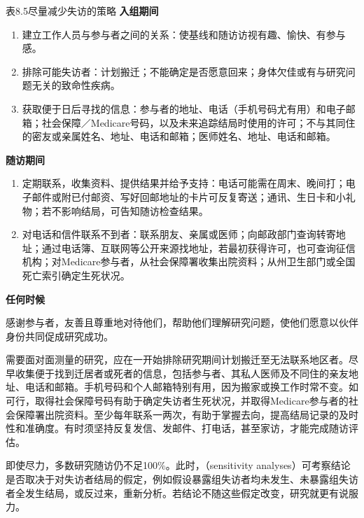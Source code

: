 \begin{bookbox}{表8.5\quad 尽量减少失访的策略}
\textbf{入组期间}
\begin{enumerate}
\item 建立工作人员与参与者之间的关系：使基线和随访访视有趣、愉快、有参与感。
\item 排除可能失访者：计划搬迁；不能确定是否愿意回来；身体欠佳或有与研究问题无关的致命性疾病。
\item 获取便于日后寻找的信息：参与者的地址、电话（手机号码尤有用）和电子邮箱；社会保障／Medicare号码，以及未来追踪结局时使用的许可；不与其同住的密友或亲属姓名、地址、电话和邮箱；医师姓名、地址、电话和邮箱。
\end{enumerate}
\textbf{随访期间}
\begin{enumerate}
\item 定期联系，收集资料、提供结果并给予支持：电话可能需在周末、晚间打；电子邮件或附已付邮资、写好回邮地址的卡片可反复寄送；通讯、生日卡和小礼物；若不影响结局，可告知随访检查结果。
\item 对电话和信件联系不到者：联系朋友、亲属或医师；向邮政部门查询转寄地址；通过电话簿、互联网等公开来源找地址，若最初获得许可，也可查询征信机构；对Medicare参与者，从社会保障署收集出院资料；从州卫生部门或全国死亡索引确定生死状况。
\end{enumerate}
\textbf{任何时候}

感谢参与者，友善且尊重地对待他们，帮助他们理解研究问题，使他们愿意以伙伴身份共同促成研究成功。
\end{bookbox}

需要面对面测量的研究，应在一开始排除研究期间计划搬迁至无法联系地区者。尽早收集便于找到迁居者或死者的信息，包括参与者、其私人医师及不同住的亲友地址、电话和邮箱。手机号码和个人邮箱特别有用，因为搬家或换工作时常不变。如可行，取得社会保障号码有助于确定失访者生死状况，并取得Medicare参与者的社会保障署出院资料。至少每年联系一两次，有助于掌握去向，提高结局记录的及时性和准确度。有时须坚持反复发信、发邮件、打电话，甚至家访，才能完成随访评估。

即使尽力，多数研究随访仍不足100\%。此时，（sensitivity analyses）可考察结论是否取决于对失访者结局的假定，例如假设暴露组失访者均未发生、未暴露组失访者全发生结局，或反过来，重新分析。若结论不随这些假定改变，研究就更有说服力。

